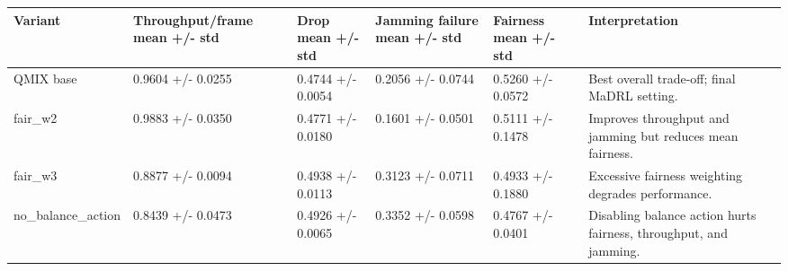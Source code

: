 \begin{tabular}{llllll}
\hline
Variant & Throughput/frame mean +/- std & Drop mean +/- std & Jamming failure mean +/- std & Fairness mean +/- std & Interpretation \\
\hline
QMIX base & 0.9604 +/- 0.0255 & 0.4744 +/- 0.0054 & 0.2056 +/- 0.0744 & 0.5260 +/- 0.0572 & Best overall trade-off; final MaDRL setting. \\
fair\_w2 & 0.9883 +/- 0.0350 & 0.4771 +/- 0.0180 & 0.1601 +/- 0.0501 & 0.5111 +/- 0.1478 & Improves throughput and jamming but reduces mean fairness. \\
fair\_w3 & 0.8877 +/- 0.0094 & 0.4938 +/- 0.0113 & 0.3123 +/- 0.0711 & 0.4933 +/- 0.1880 & Excessive fairness weighting degrades performance. \\
no\_balance\_action & 0.8439 +/- 0.0473 & 0.4926 +/- 0.0065 & 0.3352 +/- 0.0598 & 0.4767 +/- 0.0401 & Disabling balance action hurts fairness, throughput, and jamming. \\
\hline
\end{tabular}
